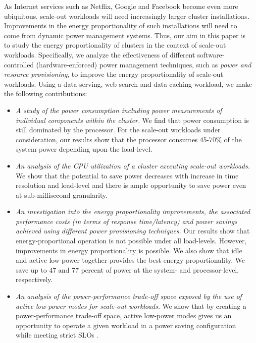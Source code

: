 \documentclass{sig-alternate}
\begin{document}
As Internet services such as Netflix, Google and Facebook become even more ubiquitous, 
scale-out workloads will need increasingly larger cluster
installations. Improvements in the energy proportionality of such
installations will need to come from dynamic power management systems. 
Thus, our aim in this paper is to study the energy proportionality of clusters 
in the context of scale-out workloads. Specifically, we analyze the
effectiveness of different software-controlled (hardware-enforced) power management 
techniques, such as \emph{power and resource provisioning}, to improve the energy
proportionality of scale-out workloads. Using a data serving, web search and data caching workload, 
we make the following contributions:

\begin{itemize}
  
\item \emph{A study of the power consumption including power measurements
  of individual components within the cluster.}  We find that
  power consumption is still dominated by the processor. For the scale-out 
  workloads under consideration, our results show that the processor 
  consumes 45-70\% of the system power depending upon the load-level. 

\item \emph{An analysis of the CPU utilization of a cluster executing scale-out workloads.} 
We show that the potential to save power decreases with increase in time resolution and load-level and 
there is ample opportunity to save power even at sub-millisecond granularity. 

\item \emph{An investigation into the energy proportionality improvements, 
the associated performance costs (in terms of response time/latency) and power 
savings achieved using different power provisioning techniques.} Our results show 
that energy-proportional operation is not possible under all load-levels. However, 
improvements in energy proportionality is possible. We also show that 
idle and active low-power together provides the best energy proportionality. We 
save up to 47 and 77 percent of power at the system- and processor-level, respectively. 

\item \emph{An analysis of the power-performance trade-off space exposed 
by the use of active low-power modes for scale-out workloads.} We show that by creating a 
power-performance trade-off space, active low-power modes gives us an opportunity to 
operate a given workload in a power saving configuration while meeting strict SLOs .


\end{itemize}
\end{document}
